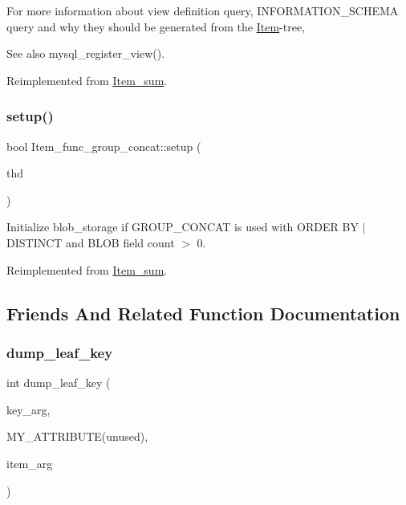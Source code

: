 For more information about view definition query, I\+N\+F\+O\+R\+M\+A\+T\+I\+O\+N\+\_\+\+S\+C\+H\+E\+MA query and why they should be generated from the \mbox{\hyperlink{classItem}{Item}}-\/tree, \begin{DoxySeeAlso}{See also}
mysql\+\_\+register\+\_\+view(). 
\end{DoxySeeAlso}


Reimplemented from \mbox{\hyperlink{classItem__sum_a0c176fad01253e4a168d0956eb1f6fc5}{Item\+\_\+sum}}.

\mbox{\label{classItem__func__group__concat_a5c268b187518bc006184424a74a5113b}} 
\subsubsection{\texorpdfstring{setup()}{setup()}}
{\footnotesize\ttfamily bool Item\+\_\+func\+\_\+group\+\_\+concat\+::setup (\begin{DoxyParamCaption}\item[{T\+HD $\ast$}]{thd }\end{DoxyParamCaption})\hspace{0.3cm}{\ttfamily [virtual]}}

Initialize blob\+\_\+storage if G\+R\+O\+U\+P\+\_\+\+C\+O\+N\+C\+AT is used with O\+R\+D\+ER BY $\vert$ D\+I\+S\+T\+I\+N\+CT and B\+L\+OB field count $>$ 0. ~\newline
 

Reimplemented from \mbox{\hyperlink{classItem__sum}{Item\+\_\+sum}}.



\subsection{Friends And Related Function Documentation}
\mbox{\label{classItem__func__group__concat_a3fff8ed469149feebd57688fa152c429}} 
\subsubsection{\texorpdfstring{dump\+\_\+leaf\+\_\+key}{dump\_leaf\_key}}
{\footnotesize\ttfamily int dump\+\_\+leaf\+\_\+key (\begin{DoxyParamCaption}\item[{void $\ast$}]{key\+\_\+arg,  }\item[{element\+\_\+count count }]{M\+Y\+\_\+\+A\+T\+T\+R\+I\+B\+U\+TE(unused),  }\item[{void $\ast$}]{item\+\_\+arg }\end{DoxyParamCaption})\hspace{0.3cm}{\ttfamily [friend]}}

